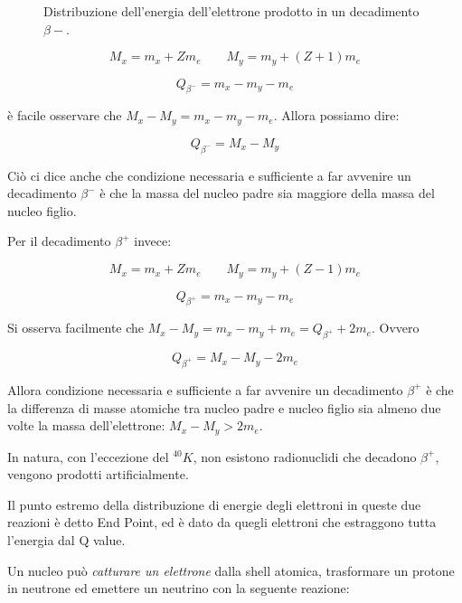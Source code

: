 \documentclass [a4paper, twoside] {book}
\begin{document}
\begin{figure} []
\centering
		\caption{Distribuzione dell'energia dell'elettrone prodotto in un decadimento $\beta-$.}
         \label{qbetameno}
\end{figure}

\begin{equation}
M_x=m_x+Zm_e 	\qquad M_y=m_y+(Z+1)m_e
\end{equation}

\begin{equation}
Q_{\beta^-}=m_x-m_y-m_e
\end{equation}

è facile osservare che $M_x-M_y=m_x-m_y-m_e$. Allora possiamo dire:

\begin{equation}
Q_{\beta^-}=M_x-M_y
\end{equation}

Ciò ci dice anche che condizione necessaria e sufficiente a far avvenire un decadimento $\beta^-$ è che la massa del nucleo padre sia maggiore della massa del nucleo figlio.

Per il decadimento $\beta^+$ invece:

\begin{equation}
M_x=m_x+Zm_e \qquad M_y=m_y+(Z-1)m_e
\end{equation}

\begin{equation}
Q_{\beta^+}=m_x-m_y-m_e
\end{equation}

Si osserva facilmente che $M_x-M_y=m_x-m_y+m_e=Q_{\beta^+}+2m_e$.
Ovvero

\begin{equation}
Q_{\beta^+}=M_x-M_y-2m_e
\end{equation}

Allora condizione necessaria e sufficiente a far avvenire un decadimento $\beta^+$ è che la differenza di masse atomiche tra nucleo padre e nucleo figlio sia almeno due volte la massa dell'elettrone: $M_x-M_y>2m_e$.

In natura, con l'eccezione del $^{40}K$, non esistono radionuclidi che decadono $\beta^+$, vengono prodotti artificialmente.

Il punto estremo della distribuzione di energie degli elettroni in queste due reazioni è detto End Point, ed è dato da quegli elettroni che estraggono tutta l'energia dal Q value.

Un nucleo può \emph{catturare un elettrone} dalla shell atomica, trasformare un protone in neutrone ed emettere un neutrino con la seguente reazione:
\end{document}
